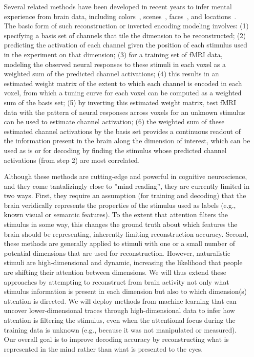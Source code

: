 Several related methods have been developed in recent years to infer
mental experience from brain data, including
colors~\citep{Brouwer:2009}, scenes~\citep{Naselaris:2009},
faces~\citep{Cowen:2014}, and locations~\citep{Sprague:2016}. The
basic form of such reconstruction or inverted encoding modeling
involves: (1) specifying a basis set of channels that tile the
dimension to be reconstructed; (2) predicting the activation of each
channel given the position of each stimulus used in the experiment on
that dimension; (3) for a training set of fMRI data, modeling the
observed neural responses to these stimuli in each voxel as a weighted
sum of the predicted channel activations; (4) this results in an
estimated weight matrix of the extent to which each channel is encoded
in each voxel, from which a tuning curve for each voxel can be
computed as a weighted sum of the basis set; (5) by inverting this
estimated weight matrix, test fMRI data with the pattern of neural
responses across voxels for an unknown stimulus can be used to
estimate channel activation; (6) the weighted sum of these estimated
channel activations by the basis set provides a continuous readout of
the information present in the brain along the dimension of interest,
which can be used as is or for decoding by finding the stimulus whose
predicted channel activations (from step 2) are most correlated.

Although these methods are cutting-edge and powerful in cognitive
neuroscience, and they come tantalizingly close to ''mind reading'',
they are currently limited in two ways. First, they require an
assumption (for training and decoding) that the brain veridically
represents the properties of the stimulus used as labels (e.g., known
visual or semantic features). To the extent that attention filters the
stimulus in some way, this changes the ground truth about which
features the brain should be representing, inherently limiting
reconstruction accuracy. Second, these methods are generally applied
to stimuli with one or a small number of potential dimensions that are
used for reconstruction. However, naturalistic stimuli are
high-dimensional and dynamic, increasing the likelihood that people
are shifting their attention between dimensions. We will thus extend
these approaches by attempting to reconstruct from brain activity not
only what stimulus information is present in each dimension but also
to which dimension(s) attention is directed. We will deploy methods
from machine learning that can uncover lower-dimensional traces
through high-dimensional data to infer how attention is filtering the
stimulus, even when the attentional focus during the training data is
unknown (e.g., because it was not manipulated or measured). Our
overall goal is to improve decoding accuracy by reconstructing what is
represented in the mind rather than what is presented to the eyes.

